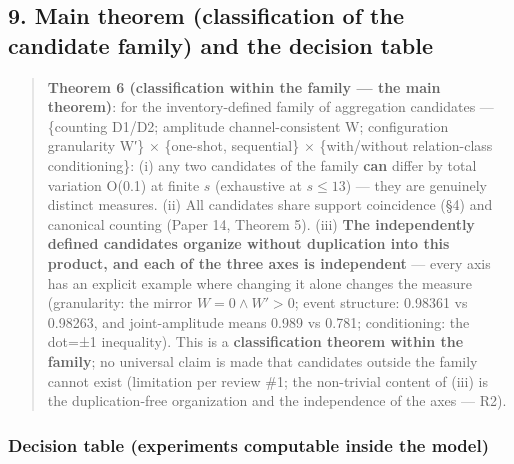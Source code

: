 \documentclass[
]{ltjsarticle}
\begin{document}
\subsection{9. Main theorem (classification of the candidate family) and
the decision
table}\label{main-theorem-classification-of-the-candidate-family-and-the-decision-table}

\begin{quote}
\textbf{Theorem 6 (classification within the family --- the main
theorem)}: for the inventory-defined family of aggregation candidates
--- \{counting D1/D2; amplitude channel-consistent W; configuration
granularity W′\} × \{one-shot, sequential\} × \{with/without
relation-class conditioning\}: (i) any two candidates of the family
\textbf{can} differ by total variation O(0.1) at finite \(s\)
(exhaustive at \(s\le13\)) --- they are genuinely distinct measures.
(ii) All candidates share support coincidence (§4) and canonical
counting (Paper 14, Theorem 5). (iii) \textbf{The independently defined
candidates organize without duplication into this product, and each of
the three axes is independent} --- every axis has an explicit example
where changing it alone changes the measure (granularity: the mirror
\(W=0\wedge W'>0\); event structure: 0.98361 vs 0.98263, and
joint-amplitude means 0.989 vs 0.781; conditioning: the dot=±1
inequality). This is a \textbf{classification theorem within the
family}; no universal claim is made that candidates outside the family
cannot exist (limitation per review \#1; the non-trivial content of
(iii) is the duplication-free organization and the independence of the
axes --- R2).
\end{quote}

\subsubsection{Decision table (experiments computable inside the
model)}\label{decision-table-experiments-computable-inside-the-model}
\end{document}
